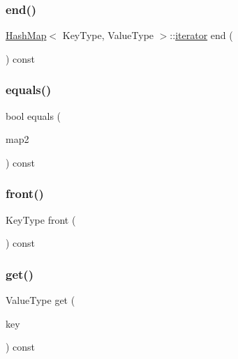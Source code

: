 \mbox{\label{classHashMap_aa8c87f05459dc398237d8d67d40294d9}} 
\subsubsection{\texorpdfstring{end()}{end()}}
{\footnotesize\ttfamily \mbox{\hyperlink{classHashMap}{Hash\+Map}}$<$ Key\+Type, Value\+Type $>$\+::\mbox{\hyperlink{classHashMap_ab3d10e70baaeac78e76b7abae7e2cf76}{iterator}} end (\begin{DoxyParamCaption}{ }\end{DoxyParamCaption}) const}

\mbox{\label{classHashMap_a2f1c1f416ba37a002b491d1ea54cd40e}} 
\subsubsection{\texorpdfstring{equals()}{equals()}}
{\footnotesize\ttfamily bool equals (\begin{DoxyParamCaption}\item[{const \mbox{\hyperlink{classHashMap}{Hash\+Map}}$<$ Key\+Type, Value\+Type $>$ \&}]{map2 }\end{DoxyParamCaption}) const}

\mbox{\label{classHashMap_a6e76878901fa73e176909ac015834f1a}} 
\subsubsection{\texorpdfstring{front()}{front()}}
{\footnotesize\ttfamily Key\+Type front (\begin{DoxyParamCaption}{ }\end{DoxyParamCaption}) const}

\mbox{\label{classHashMap_a3ac97b0a9a7fa131221427f628667ae9}} 
\subsubsection{\texorpdfstring{get()}{get()}}
{\footnotesize\ttfamily Value\+Type get (\begin{DoxyParamCaption}\item[{const Key\+Type \&}]{key }\end{DoxyParamCaption}) const}

